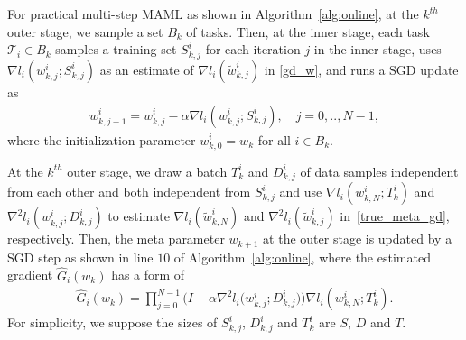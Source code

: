 \documentclass{osudissert96}
\begin{document}
\vspace{0.01cm}


For practical multi-step MAML as shown in Algorithm~\ref{alg:online}, at the $k^{th}$ outer stage, we sample a set $ B_k$ of tasks. Then,  at the inner stage, each task $\mathcal{T}_i\in B_k$ samples a training set {\small$S_{k,j}^i$} for each iteration $j$ in the inner stage, uses  {\small$\nabla l_i(w^i_{k,j};S^i_{k,j})$} as an estimate of {\small$\nabla l_i(\widetilde w^i_{k,j})$} in \cref{gd_w}, and runs a SGD update as
\begin{align}\label{es:up}
w^i_{k, j+1} = w^i_{k, j} - \alpha \nabla l_i(w^i_{k,j};S^i_{k,j}), \quad  j=0,..,N-1,
\end{align} 
where the initialization parameter $w^i_{k,0}=w_k$ for all $i \in B_k$. 

At the $k^{th}$ outer stage, we draw a  batch {\small$T^i_k$} and {\small$D_{k,j}^i$} of data samples  independent from each other and both independent from {\small$S^i_{k,j}$} and
use {\small$\nabla l_i(w_{k,N}^i;T^i_k)$} and  {\small$ \nabla^2 l_i(w_{k,j}^i; D_{k,j}^i)$} to estimate {\small$\nabla l_i(\widetilde w^i _{k,N})$} and {\small$\nabla^2 l_i(\widetilde w^i_{k,j})$} in~\cref{true_meta_gd}, respectively.
Then, the meta parameter $w_{k+1}$ at the outer stage is updated by a SGD step as shown in line $10$ of Algorithm~\ref{alg:online}, 
where the estimated gradient $\widehat G_i(w_k)$  has a form of 
\begin{align}\label{eq:metagrad_est}
\widehat G_i(w_k) =\prod_{j=0}^{N-1}\big(I - \alpha \nabla^2 l_i\big(w_{k,j}^i;D_{k,j}^i\big)\big)\nabla l_i(w_{k,N}^i; T^i_k).
\end{align}
For simplicity, we suppose the sizes of { $S_{k,j}^i$, $D_{k,j}^i$} and  { $T_k^i$}  are $S$, $D$ and $T$.
\end{document}
